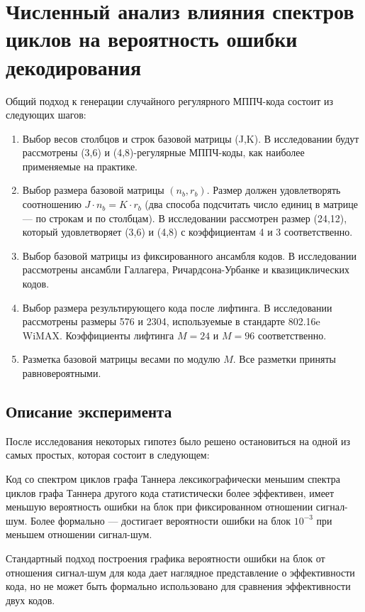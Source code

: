 \chapter{Численный анализ влияния спектров циклов на вероятность ошибки 
декодирования} 

Общий подход к генерации случайного регулярного МППЧ-кода состоит из следующих шагов:
\begin{enumerate}
	\item Выбор весов столбцов и строк базовой матрицы (J,K). В исследовании будут рассмотрены
	(3,6) и (4,8)-регулярные МППЧ-коды, как наиболее применяемые на практике.
	\item Выбор размера базовой матрицы $(n_b,r_b)$. Размер должен удовлетворять соотношению 
	$J \cdot n_b = K \cdot r_b$ (два способа подсчитать число единиц в матрице --- по строкам и по столбцам).
	В исследовании рассмотрен размер (24,12), который удовлетворяет (3,6) и (4,8) с коэффициентам 4 и 3
	соответственно.
	\item Выбор базовой матрицы из фиксированного ансамбля кодов. В исследовании рассмотрены ансамбли
	Галлагера, Ричардсона-Урбанке и квазициклических кодов.
	\item Выбор размера результирующего кода после лифтинга. В исследовании рассмотрены размеры
	576 и 2304, используемые в стандарте 802.16e WiMAX. Коэффициенты лифтинга $M=24$ и $M=96$
	соответственно.
	\item Разметка базовой матрицы весами по модулю $M$. Все разметки приняты равновероятными.
\end{enumerate}

\section{Описание эксперимента}

После исследования некоторых гипотез было решено остановиться на одной из самых простых, которая состоит в
следующем:
\begin{conjecture}
	Код со спектром циклов графа Таннера лексикографически меньшим спектра циклов графа Таннера другого
	кода статистически более эффективен, имеет меньшую вероятность ошибки на блок при фиксированном отношении
	сигнал-шум. Более формально --- достигает вероятности ошибки на блок $10^{-3}$ при меньшем отношении
	сигнал-шум.
\end{conjecture}

Стандартный подход построения графика вероятности ошибки на блок от отношения
сигнал-шум для кода дает наглядное представление о эффективности кода, но не может быть формально использовано
для сравнения эффективности двух кодов.

